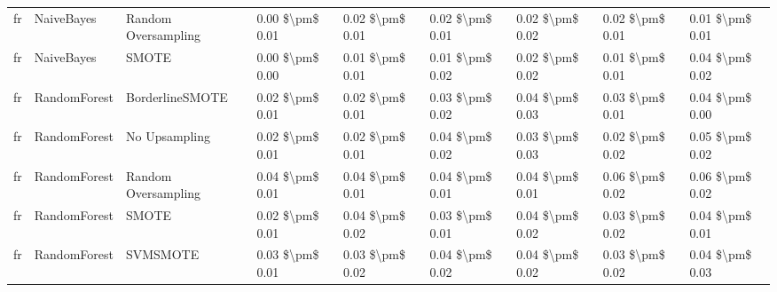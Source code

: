 \begin{tabular}{lllllllll}
      fr &                      NaiveBayes &           Random Oversampling & 0.00 \$\textbackslash pm\$ 0.01 &           0.02 \$\textbackslash pm\$ 0.01 &       0.02 \$\textbackslash pm\$ 0.01 &        0.02 \$\textbackslash pm\$ 0.02 &                         0.02 \$\textbackslash pm\$ 0.01 &     0.01 \$\textbackslash pm\$ 0.01 \\
      fr &                      NaiveBayes &                         SMOTE & 0.00 \$\textbackslash pm\$ 0.00 &           0.01 \$\textbackslash pm\$ 0.01 &       0.01 \$\textbackslash pm\$ 0.02 &        0.02 \$\textbackslash pm\$ 0.02 &                         0.01 \$\textbackslash pm\$ 0.01 &     0.04 \$\textbackslash pm\$ 0.02 \\
      fr &                    RandomForest &               BorderlineSMOTE & 0.02 \$\textbackslash pm\$ 0.01 &           0.02 \$\textbackslash pm\$ 0.01 &       0.03 \$\textbackslash pm\$ 0.02 &        0.04 \$\textbackslash pm\$ 0.03 &                         0.03 \$\textbackslash pm\$ 0.01 &     0.04 \$\textbackslash pm\$ 0.00 \\
      fr &                    RandomForest &                 No Upsampling & 0.02 \$\textbackslash pm\$ 0.01 &           0.02 \$\textbackslash pm\$ 0.01 &       0.04 \$\textbackslash pm\$ 0.02 &        0.03 \$\textbackslash pm\$ 0.03 &                         0.02 \$\textbackslash pm\$ 0.02 &     0.05 \$\textbackslash pm\$ 0.02 \\
      fr &                    RandomForest &           Random Oversampling & 0.04 \$\textbackslash pm\$ 0.01 &           0.04 \$\textbackslash pm\$ 0.01 &       0.04 \$\textbackslash pm\$ 0.01 &        0.04 \$\textbackslash pm\$ 0.01 &                         0.06 \$\textbackslash pm\$ 0.02 &     0.06 \$\textbackslash pm\$ 0.02 \\
      fr &                    RandomForest &                         SMOTE & 0.02 \$\textbackslash pm\$ 0.01 &           0.04 \$\textbackslash pm\$ 0.02 &       0.03 \$\textbackslash pm\$ 0.01 &        0.04 \$\textbackslash pm\$ 0.02 &                         0.03 \$\textbackslash pm\$ 0.02 &     0.04 \$\textbackslash pm\$ 0.01 \\
      fr &                    RandomForest &                      SVMSMOTE & 0.03 \$\textbackslash pm\$ 0.01 &           0.03 \$\textbackslash pm\$ 0.02 &       0.04 \$\textbackslash pm\$ 0.02 &        0.04 \$\textbackslash pm\$ 0.02 &                         0.03 \$\textbackslash pm\$ 0.02 &     0.04 \$\textbackslash pm\$ 0.03 \\

\end{tabular}

